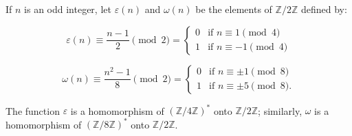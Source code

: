 If $n$ is an odd integer, let $\varepsilon(n)$ and $\omega(n)$ be the elements of $\mathbb{Z}/2\mathbb{Z}$ defined by:

$$\varepsilon(n) \equiv \frac{n-1}{2} \pmod{2} = \begin{cases} 0 & \text{if } n \equiv 1 \pmod{4} \\ 1 & \text{if } n \equiv -1 \pmod{4} \end{cases}$$

$$\omega(n) \equiv \frac{n^2-1}{8} \pmod{2} = \begin{cases} 0 & \text{if } n \equiv \pm 1 \pmod{8} \\ 1 & \text{if } n \equiv \pm 5 \pmod{8}. \end{cases}$$

The function $\varepsilon$ is a homomorphism of $(\mathbb{Z}/4\mathbb{Z})^*$ onto $\mathbb{Z}/2\mathbb{Z}$; similarly, $\omega$ is a homomorphism of $(\mathbb{Z}/8\mathbb{Z})^*$ onto $\mathbb{Z}/2\mathbb{Z}$.
